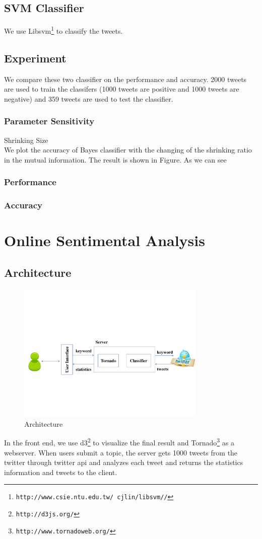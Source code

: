 \documentclass{article}
\begin{document}
\subsection{SVM Classifier}
We use Libsvm\footnote{\texttt{\scriptsize{http://www.csie.ntu.edu.tw/~cjlin/libsvm//‎‎}}} to classify the tweets. ‎
\subsection{Experiment}
We compare these two classifier on the performance and accuracy. 2000 tweets are used to train the classifers (1000 tweets are positive and 1000 tweets are negative) and 359 tweets are used to test the classifier.
\subsubsection{Parameter Sensitivity}
Shrinking Size \\
We plot the accuracy of Bayes classifier with the changing of the shrinking ratio in the mutual information. The result is shown in Figure. As we can see 
\subsubsection{Performance}
\subsubsection{Accuracy}
\section{Online Sentimental Analysis}
\subsection{Architecture}
\begin{figure}
\centering
\includegraphics[width=0.8\textwidth]{pics/architecture.pdf}
\caption{Architecture}
\label{Fig:architecture}
\end{figure}
In the front end, we use d3\footnote{\texttt{\scriptsize{http://d3js.org/‎‎}}} to visualize the final result and Tornado\footnote{\texttt{\scriptsize{http://www.tornadoweb.org/}}} as a webserver. When users submit a topic, the server gets 1000 tweets from the twitter through twitter api and analyzes each tweet and returns the statistics information and tweets to the client. 
\end{document}
